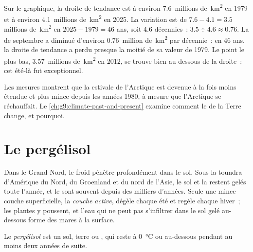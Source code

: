 \begin{example}
Sur le graphique, la droite de tendance est à environ
\num{7.6}~millions de~\unit{km^2} en 1979 et à environ
\num{4.1}~millions de~\unit{km^2} en 2025. La variation est de $7.6 - 4.1 =
3.5$ millions de~km$^2$ en $2025 - 1979 = 46$ ans, soit 4.6 décennies~:
$3.5 \div 4.6 \approx 0.76$. La  de septembre a diminué d'environ
\num{0.76}~million de~\unit{km^2} par décennie~: en 46 ans, la droite de
tendance a perdu presque la moitié de sa valeur de 1979. Le point le plus
bas, \num{3.57}~millions de~\unit{km^2} en 2012, se trouve bien au-dessous
de la droite~: cet été-là fut exceptionnel.
\end{example}

Les mesures montrent que la  estivale de l'Arctique est devenue à
la fois moins étendue et plus mince depuis les années 1980, à mesure que
l'Arctique se réchauffait. Le \cref{ch:g9:climate-past-and-present}
examine comment le  de la Terre change, et pourquoi.

\section{Le pergélisol}

Dans le Grand Nord, le froid pénètre profondément dans le sol. Sous la
toundra d'Amérique du Nord, du Groenland et du nord de l'Asie, le sol et
la  restent gelés toute l'année, et le sont souvent depuis des
milliers d'années. Seule une mince couche superficielle, la
\emph{couche active}, dégèle chaque été et regèle chaque hiver~; les
plantes y poussent, et l'eau qui ne peut pas s'infiltrer dans le sol gelé
au-dessous forme des mares à la surface.

\begin{definition}[Pergélisol]\label{def:g8:ice-on-earth:permafrost}
Le \emph{pergélisol} est un sol, terre ou , qui reste à
\qty{0}{\degreeCelsius} ou au-dessous pendant au moins deux années de suite.
\end{definition}

